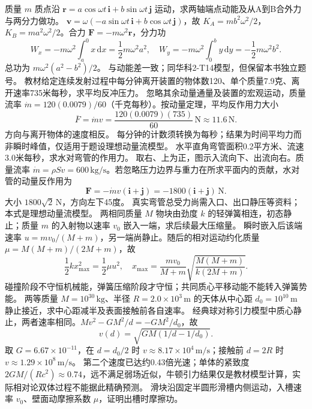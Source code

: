 \problemtext 质量 $m$ 质点沿 $\bm r=a\cos\omega t\,\bm i+b\sin\omega t\,\bm j$ 运动，求两轴端点动能及从A到B合外力与两分力做功。
\workings $\bm v=\omega(-a\sin\omega t\,\bm i+b\cos\omega t\,\bm j)$，故 $K_A=mb^2\omega^2/2$，$K_B=ma^2\omega^2/2$。合力 $\bm F=-m\omega^2\bm r$，分力功
\[
W_x=-m\omega^2\int_a^0 x\,\mathrm dx=\frac12m\omega^2a^2,\quad
W_y=-m\omega^2\int_0^b y\,\mathrm dy=-\frac12m\omega^2b^2.
\]
总功为 $m\omega^2(a^2-b^2)/2$。
\crosscheck 与动能差一致；同华科2-T14模型，但保留本书独立题号。
\problemtext 教材给定连续发射过程中每分钟离开装置的物体数120、单个质量7.9克、离开速率735米每秒，求平均反冲压力。
\workings 忽略其余动量通量及装置的宏观运动，质量流率 $\dot m=120(0.0079)/60$（千克每秒）。按动量定理，平均反作用力大小
\[
\overline F=\dot m v=\frac{120(0.0079)(735)}{60}\,\mathrm N\approx11.6\,\mathrm N.
\]
方向与离开物体的速度相反。
\crosscheck 每分钟的计数须转换为每秒；结果为时间平均力而非瞬时峰值，仅适用于题设理想动量流模型。
\problemtext 水平直角弯管面积0.2平方米、流速3.0米每秒，求水对弯管的作用力。
\workings 取右、上为正，图示入流向下、出流向右。质量流率 $\dot m=\rho Sv=600\,\mathrm{kg/s}$。若忽略压力边界与重力在所求平面内的贡献，水对管的动量反作用为
\[
\bm F=-\dot m v(\bm i+\bm j)=-1800(\bm i+\bm j)\,\mathrm N.
\]
大小 $1800\sqrt2\,\mathrm N$，方向左下45度。
\crosscheck 真实弯管总受力尚需入口、出口静压等资料；本式是理想动量流模型。
\problemtext 两相同质量 $M$ 物块由劲度 $k$ 的轻弹簧相连，初态静止；质量 $m$ 的入射物以速率 $v_0$ 嵌入一端，求后续最大压缩量。
\workings 瞬时嵌入后该端速率 $u=mv_0/(M+m)$，另一端尚静止。随后的相对运动约化质量 $\mu=M(M+m)/(2M+m)$，故
\[
\frac12kx_{\max}^2=\frac12\mu u^2,\quad
x_{\max}=\frac{mv_0}{M+m}\sqrt{\frac{M(M+m)}{k(2M+m)}}.
\]
\crosscheck 碰撞阶段不守恒机械能，弹簧压缩阶段才守恒；共同质心平移动能不能转入弹簧势能。
\problemtext 两等质量 $M=10^{30}\,\mathrm{kg}$、半径 $R=2.0\times10^3\,\mathrm m$ 的天体从中心距 $d_0=10^{10}\,\mathrm m$ 静止接近，求中心距减半及表面接触前各自速率。
\workings 经典球对称引力模型中质心静止，两者速率相同。$Mv^2-GM^2/d=-GM^2/d_0$，故
\[
v(d)=\sqrt{GM(1/d-1/d_0)}.
\]
取 $G=6.67\times10^{-11}$，在 $d=d_0/2$ 时 $v\approx8.17\times10^4\,\mathrm{m/s}$；接触前 $d=2R$ 时 $v\approx1.29\times10^8\,\mathrm{m/s}$。
\crosscheck 第二个速度已达约0.43倍光速；单体的紧致度 $2GM/(Rc^2)\approx0.74$，远不满足弱场近似，牛顿引力结果仅是教材模型计算，实际相对论双体过程不能据此精确预测。
\problemtext 滑块沿固定半圆形滑槽内侧运动，入槽速率 $v_0$、壁面动摩擦系数 $\mu$，证明出槽时摩擦功。
